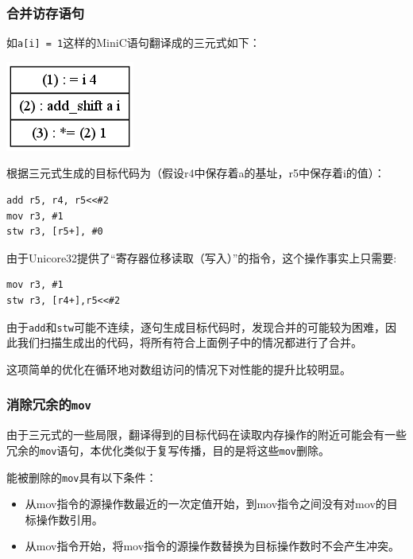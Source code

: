 \subsubsection{合并访存语句}
如\verb|a[i] = 1|这样的MiniC语句翻译成的三元式如下：
\begin{center}
	\includegraphics[scale=0.50]{merge_ldst.png}
	\label{fig:mergeldst}
\end{center}
根据三元式生成的目标代码为（假设r4中保存着a的基址，r5中保存着i的值）：
\begin{verbatim}
add r5, r4, r5<<#2
mov r3, #1
stw r3, [r5+], #0
\end{verbatim}
由于Unicore32提供了“寄存器位移读取（写入）”的指令，这个操作事实上只需要:
\begin{verbatim}
mov r3, #1
stw r3, [r4+],r5<<#2
\end{verbatim}
由于\verb|add|和\verb|stw|可能不连续，逐句生成目标代码时，发现合并的可能较为困难，因此我们扫描生成出的代码，将所有符合上面例子中的情况都进行了合并。

这项简单的优化在循环地对数组访问的情况下对性能的提升比较明显。
\subsubsection{消除冗余的\lstinline|mov|}
由于三元式的一些局限，翻译得到的目标代码在读取内存操作的附近可能会有一些冗余的\verb|mov|语句，本优化类似于复写传播，目的是将这些\verb|mov|删除。

能被删除的\verb|mov|具有以下条件：
\begin{itemize}
	\item 从mov指令的源操作数最近的一次定值开始，到mov指令之间没有对mov的目标操作数引用。
	\item 从mov指令开始，将mov指令的源操作数替换为目标操作数时不会产生冲突。
\end{itemize}
